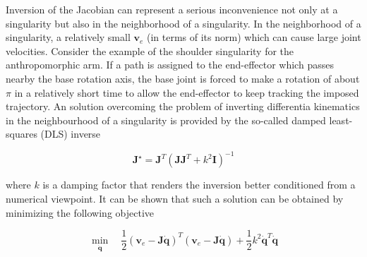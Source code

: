 \documentclass[10pt]{article}
\begin{document}
Inversion of the Jacobian can represent a serious inconvenience not only at a singularity but also in the neighborhood of a singularity. In the neighborhood of a singularity,  a relatively small $\boldsymbol{v}_{e}$ (in terms of its norm)  which can cause large joint velocities. Consider the example of the shoulder singularity for the anthropomorphic arm. If a path is assigned to the end-effector which passes nearby the base rotation axis, the base joint is forced to make a rotation of about $\pi$ in a relatively short time to allow the end-effector to keep tracking the imposed trajectory. An solution overcoming the problem of inverting differentia kinematics in the neighbourhood of a singularity is provided by the so-called damped least-squares (DLS) inverse

$$
\boldsymbol{J}^{\star}=\boldsymbol{J}^{T}\left(\boldsymbol{J} \boldsymbol{J}^{T}+k^{2} \boldsymbol{I}\right)^{-1}
$$

where $k$ is a damping factor that renders the inversion better conditioned from a numerical viewpoint. It can be shown that such a solution can be obtained by minimizing the following objective

$$
 \min_{\dot{\boldsymbol{q}}}\quad \frac{1}{2}\left(\boldsymbol{v}_{e}-\boldsymbol{J} \dot{\boldsymbol{q}}\right)^{T}\left(\boldsymbol{v}_{e}-\boldsymbol{J} \dot{\boldsymbol{q}}\right)+\frac{1}{2} k^{2} \dot{\boldsymbol{q}}^{T} \dot{\boldsymbol{q}}
$$
\end{document}
